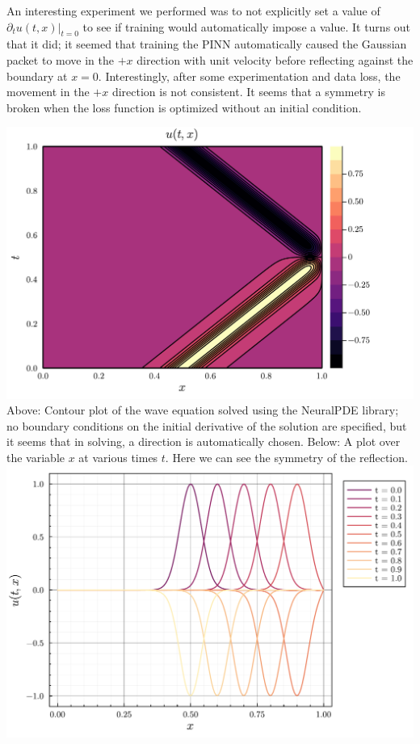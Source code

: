 \documentclass[11pt]{article}
\newcommand{\1}{\mathbf 1}
\begin{document}
An interesting experiment we performed was to not explicitly set a value of $\left.\partial_t u(t,x)\right|_{t = 0}$ to see if training would automatically impose a value.
It turns out that it did; it seemed that training the PINN automatically caused the Gaussian packet to move in the $+x$ direction with unit velocity before reflecting against the boundary at $x = 0$.
Interestingly, after some experimentation and data loss, the movement in the $+x$ direction is not consistent.
It seems that a symmetry is broken when the loss function is optimized without an initial condition.
\begin{center}
	\includegraphics[width=0.9\linewidth]{fig/wave-no-bcs-cont.pdf}
	\\
	Above: Contour plot of the wave equation solved using the NeuralPDE library; no boundary conditions on the initial derivative of the solution are specified, but it seems that in solving, a direction is automatically chosen.
	Below: A plot over the variable $x$ at various times $t$.
	Here we can see the symmetry of the reflection.
	\\
	\includegraphics[width=0.9\linewidth]{fig/wave-no-bcs-per-x.pdf}
\end{center}
\end{document}
